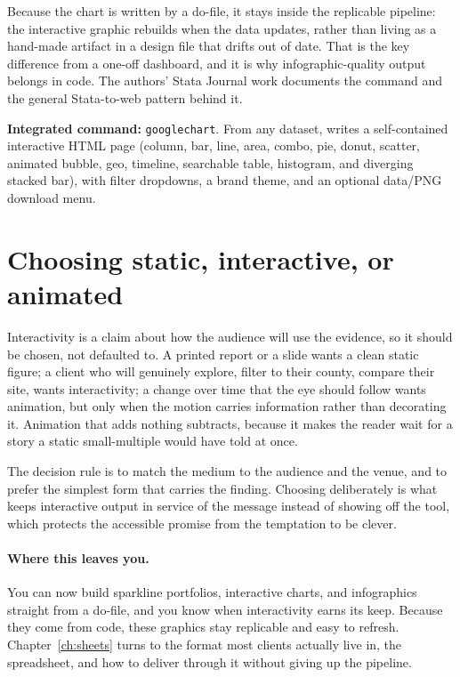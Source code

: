 \documentclass[
    a4paper,
    fontsize=10pt,
    twoside=true,
    numbers=noenddot,
]{kaobook}
\begin{document}
Because the chart is written by a do-file, it stays inside the replicable pipeline: the interactive graphic rebuilds when the data updates, rather than living as a hand-made artifact in a design file that drifts out of date. That is the key difference from a one-off dashboard, and it is why infographic-quality output belongs in code. The authors' Stata Journal work documents the command and the general Stata-to-web pattern behind it.

\begin{kaobox}[frametitle=Package Integration: \texttt{googlechart}]
\textbf{Integrated command:} \texttt{googlechart}. From any dataset, writes a self-contained interactive HTML page (column, bar, line, area, combo, pie, donut, scatter, animated bubble, geo, timeline, searchable table, histogram, and diverging stacked bar), with filter dropdowns, a brand theme, and an optional data/PNG download menu.
\end{kaobox}

\section{Choosing static, interactive, or animated}
Interactivity is a claim about how the audience will use the evidence, so it should be chosen, not defaulted to. A printed report or a slide wants a clean static figure; a client who will genuinely explore, filter to their county, compare their site, wants interactivity; a change over time that the eye should follow wants animation, but only when the motion carries information rather than decorating it. Animation that adds nothing subtracts, because it makes the reader wait for a story a static small-multiple would have told at once.

The decision rule is to match the medium to the audience and the venue, and to prefer the simplest form that carries the finding. Choosing deliberately is what keeps interactive output in service of the message instead of showing off the tool, which protects the accessible promise from the temptation to be clever.

\paragraph{Where this leaves you.} You can now build sparkline portfolios, interactive charts, and infographics straight from a do-file, and you know when interactivity earns its keep. Because they come from code, these graphics stay replicable and easy to refresh. Chapter~\ref{ch:sheets} turns to the format most clients actually live in, the spreadsheet, and how to deliver through it without giving up the pipeline.
\end{document}
